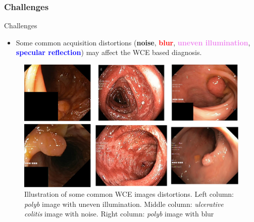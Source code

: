 \documentclass{libs/ufc_format}
\begin{document}
\subsubsection{Challenges}
\begin{frame}{Challenges}
    \begin{itemize}
        \item Some common acquisition distortions (\textbf{noise}, \textcolor{red}{\textbf{blur}}, \textcolor{violet}{\textbf{uneven illumination}}, \textcolor{blue}{\textbf{specular reflection}}) may affect the WCE based diagnosis.
    \end{itemize}


    \begin{figure}
        \centering
        \includegraphics[scale=0.13]{libs/examdis.png}
        \caption{Illustration of some common WCE images distortions. Left column: \textit{polyb} image with uneven illumination. Middle column: \textit{ulcerative colitis} image with noise. Right column: \textit{polyb} image with blur}
        \label{fig:endoscopy}
    \end{figure}

\end{frame}
\end{document}
